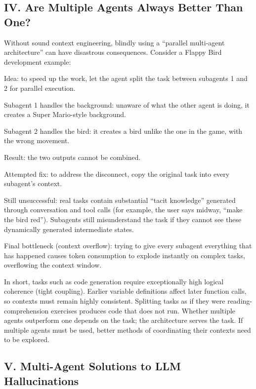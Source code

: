 \hypertarget{iv.-are-multiple-agents-always-better-than-one}{%
\subsection{IV. Are Multiple Agents Always Better Than One?}\label{iv.-are-multiple-agents-always-better-than-one}}

Without sound context engineering, blindly using a ``parallel multi-agent architecture'' can have disastrous consequences. Consider a Flappy Bird development example:

Idea: to speed up the work, let the agent split the task between subagents 1 and 2 for parallel execution.

Subagent 1 handles the background: unaware of what the other agent is doing, it creates a Super Mario-style background.

Subagent 2 handles the bird: it creates a bird unlike the one in the game, with the wrong movement.

Result: the two outputs cannot be combined.

Attempted fix: to address the disconnect, copy the original task into every subagent's context.

Still unsuccessful: real tasks contain substantial ``tacit knowledge'' generated through conversation and tool calls (for example, the user says midway, ``make the bird red''). Subagents still misunderstand the task if they cannot see these dynamically generated intermediate states.

Final bottleneck (context overflow): trying to give every subagent everything that has happened causes token consumption to explode instantly on complex tasks, overflowing the context window.

In short, tasks such as code generation require exceptionally high logical coherence (tight coupling). Earlier variable definitions affect later function calls, so contexts must remain highly consistent. Splitting tasks as if they were reading-comprehension exercises produces code that does not run. Whether multiple agents outperform one depends on the task; the architecture serves the task. If multiple agents must be used, better methods of coordinating their contexts need to be explored.

\hypertarget{v.-multi-agent-solutions-to-llm-hallucinations}{%
\subsection{V. Multi-Agent Solutions to LLM Hallucinations}\label{v.-multi-agent-solutions-to-llm-hallucinations}}

